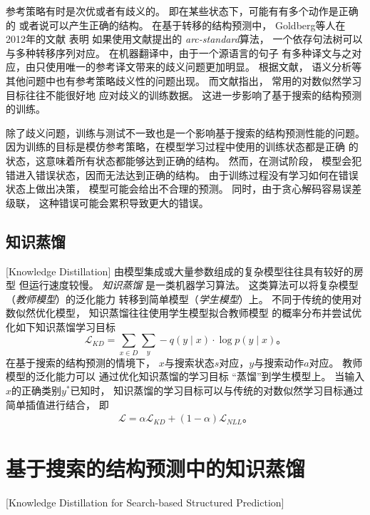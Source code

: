 参考策略有时是次优或者有歧义的。
即在某些状态下，可能有有多个动作是正确的
或者说可以产生正确的结构。
在基于转移的结构预测中，
Goldberg等人在2012年的文献
表明
如果使用文献提出的
{\it arc-standard}算法，
一个依存句法树可以与多种转移序列对应。
在机器翻译中，由于一个源语言的句子
有多种译文与之对应，由只使用唯一的参考译文带来的歧义问题更加明显。
根据文献，
语义分析等其他问题中也有参考策略歧义性的问题出现。
而文献指出，
常用的对数似然学习目标往往不能很好地
应对歧义的训练数据。
这进一步影响了基于搜索的结构预测的训练。

除了歧义问题，训练与测试不一致也是一个影响基于搜索的结构预测性能的问题。
因为训练的目标是模仿参考策略，在模型学习过程中使用的训练状态都是正确
的状态，这意味着所有状态都能够达到正确的结构。
然而，在测试阶段，
模型会犯错进入错误状态，因而无法达到正确的结构。
由于训练过程没有学习如何在错误状态上做出决策，
模型可能会给出不合理的预测。
同时，由于贪心解码容易误差级联，
这种错误可能会累积导致更大的错误。

\subsection{知识蒸馏}[Knowledge Distillation]
由模型集成或大量参数组成的复杂模型往往具有较好的房型
但运行速度较慢。
\textit{知识蒸馏}\cite{Bucilua:2006:MC:1150402.1150464,NIPS2014_5484,DBLP:journals/corr/HintonVD15}
是一类机器学习算法。
这类算法可以将复杂模型（\textit{教师模型}）的泛化能力
转移到简单模型（\textit{学生模型}）上。
不同于传统的使用对数似然优化模型，
知识蒸馏往往使用学生模型拟合教师模型
的概率分布并尝试优化如下知识蒸馏学习目标
\[
\mathcal{L}_{KD} =  \sum_{x \in D} \sum_{y} -q(y
\mid x) \cdot \log p(y \mid x)\text{。}
\]
在基于搜索的结构预测的情境下，
$x$与搜索状态$s$对应，$y$与搜索动作$a$对应。
教师模型的泛化能力可以
通过优化知识蒸馏的学习目标
``蒸馏''到学生模型上。
当输入$x$的正确类别$y^*$已知时，
知识蒸馏的学习目标可以与传统的对数似然学习目标通过简单插值进行结合，
即
\begin{align}\label{eq:distill:distill}
\mathcal{L} = \alpha \mathcal{L}_{KD} + (1 - \alpha) \mathcal{L}_{NLL}\text{。}
\end{align}

\section{基于搜索的结构预测中的知识蒸馏}[Knowledge Distillation for Search-based Structured Prediction]

